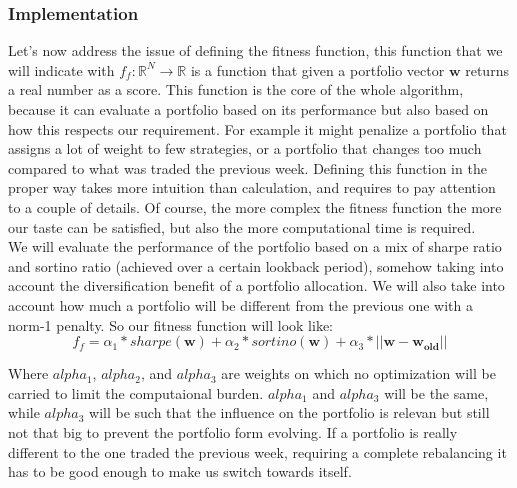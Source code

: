 \documentclass[a4paper]{article}
\begin{document}
\subsubsection*{Implementation}


Let's now address the issue of defining the fitness function, this function that we will indicate with $f_f: \mathbb{R}^N \rightarrow \mathbb{R}$ is a function that given a portfolio vector $\mathbf{w}$ returns a real number as a score. This function is the core of the whole algorithm, because it can evaluate a portfolio based on its performance but also based on how this respects our requirement. For example it might penalize a portfolio that assigns a lot of weight to few strategies, or a portfolio that changes too much compared to what was traded the previous week. Defining this function in the proper way takes more intuition than calculation, and requires to pay attention to a couple of details. Of course, the more complex the fitness function the more our taste can be satisfied, but also the more computational time is required.\\
We will evaluate the performance of the portfolio based on a mix of sharpe ratio and sortino ratio (achieved over a certain lookback period), somehow taking into account the diversification benefit of a portfolio allocation. We will also take into account how much a portfolio will be different from the previous one with a norm-1 penalty.
So our fitness function will look like:\\

$$
f_f = \alpha_1*sharpe(\mathbf{w}) + \alpha_2*sortino(\mathbf{w}) + \alpha_3*||\mathbf{w} - \mathbf{w_{old}}||
$$

Where $alpha_1$, $alpha_2$, and $alpha_3$ are weights on which no optimization will be carried to limit the computaional burden. $alpha_1$ and $alpha_3$ will be the same, while $alpha_3$ will be such that the influence on the portfolio is relevan but still not that big to prevent the portfolio form evolving. If a portfolio is really different to the one traded the previous week, requiring a complete rebalancing it has to be good enough to make us switch towards itself. 

\\
\\
\end{document}
